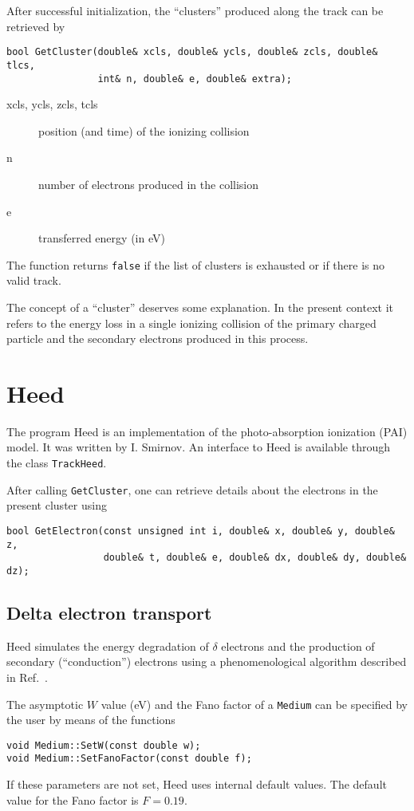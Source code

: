 After successful initialization, the ``clusters'' produced along the track
can be retrieved by
\begin{lstlisting}
bool GetCluster(double& xcls, double& ycls, double& zcls, double& tlcs,
                int& n, double& e, double& extra);
\end{lstlisting}
\begin{description}
  \item[xcls, ycls, zcls, tcls] 
  position (and time) of the ionizing collision
  \item[n] number of electrons produced in the collision
  \item[e] transferred energy (in eV)
\end{description}
The function returns \texttt{false} if the list of clusters is exhausted
 or if there is no valid track.

The concept of a ``cluster'' deserves some explanation. 
In the present context it refers to the energy loss in a single ionizing 
collision of the primary charged particle and the secondary 
electrons produced in this process. 


\section{Heed}\label{Sec:Heed}

The program Heed \cite{Smirnov2005} is an implementation 
of the photo-absorption ionization (PAI) model. 
It was written by I. Smirnov.
An interface to Heed is available through the class \texttt{TrackHeed}. 

After calling \texttt{GetCluster}, 
one can retrieve details about the 
electrons in the present cluster using
\begin{lstlisting}
bool GetElectron(const unsigned int i, double& x, double& y, double& z,
                 double& t, double& e, double& dx, double& dy, double& dz);
\end{lstlisting}

\subsection{Delta electron transport}

Heed simulates the energy degradation of \(\delta\) electrons and 
the production of secondary (``conduction'') electrons 
using a phenomenological algorithm described in Ref.~\cite{Smirnov2005}.

The asymptotic \(W\) value (eV) and the Fano factor of a 
\texttt{Medium} can be specified by the user by means of the functions
\begin{lstlisting}
void Medium::SetW(const double w);
void Medium::SetFanoFactor(const double f);
\end{lstlisting}
If these parameters are not set, Heed uses internal default values. 
The default value for the Fano factor is \(F = 0.19\).

